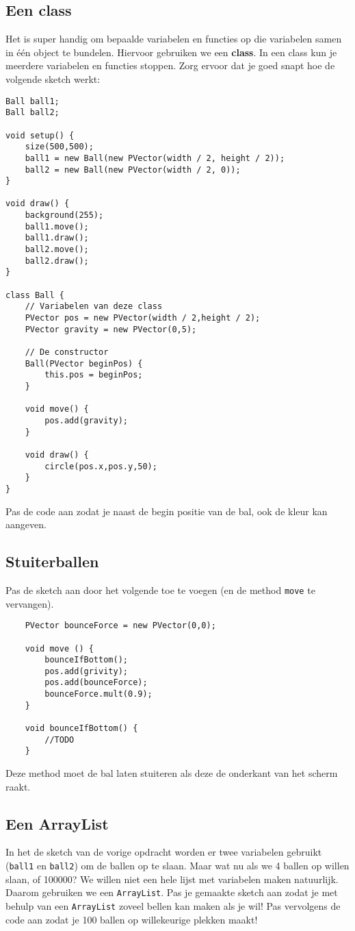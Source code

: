 \documentclass{../qh_exercise}
\begin{document}
\subsection{Een class}
Het is super handig om bepaalde variabelen en functies op die variabelen samen in \'e\'en object te bundelen. Hiervoor gebruiken we een \textbf{class}. In een class kun je meerdere variabelen en functies stoppen. Zorg ervoor dat je goed snapt hoe de volgende sketch werkt:
\begin{lstlisting}
Ball ball1;
Ball ball2;

void setup() {
    size(500,500);
    ball1 = new Ball(new PVector(width / 2, height / 2));
    ball2 = new Ball(new PVector(width / 2, 0));
}

void draw() {
    background(255);
    ball1.move();
    ball1.draw();
    ball2.move();
    ball2.draw();
}

class Ball {
    // Variabelen van deze class
    PVector pos = new PVector(width / 2,height / 2);
    PVector gravity = new PVector(0,5);
    
    // De constructor
    Ball(PVector beginPos) {
        this.pos = beginPos;
    }
    
    void move() {
        pos.add(gravity);
    }
    
    void draw() {
        circle(pos.x,pos.y,50);
    }
}
\end{lstlisting}
Pas de code aan zodat je naast de begin positie van de bal, ook de kleur kan aangeven.

\newpage
\subsection{Stuiterballen}
Pas de sketch aan door het volgende toe te voegen (en de method \texttt{move} te vervangen).
\begin{lstlisting}
    PVector bounceForce = new PVector(0,0);

    void move () {
        bounceIfBottom();
        pos.add(grivity);
        pos.add(bounceForce);
        bounceForce.mult(0.9);
    }

    void bounceIfBottom() {
        //TODO
    }
\end{lstlisting}
Deze method moet de bal laten stuiteren als deze de onderkant van het scherm raakt. 

\subsection{Een ArrayList}
In het de sketch van de vorige opdracht worden er twee variabelen gebruikt (\texttt{ball1} en \texttt{ball2}) om de ballen op te slaan. Maar wat nu als we 4 ballen op willen slaan, of 100000? We willen niet een hele lijst met variabelen maken natuurlijk. Daarom gebruiken we een \texttt{ArrayList}. Pas je gemaakte sketch aan zodat je met behulp van een \texttt{ArrayList} zoveel bellen kan maken als je wil!
Pas vervolgens de code aan zodat je 100 ballen op willekeurige plekken maakt!
\end{document}
